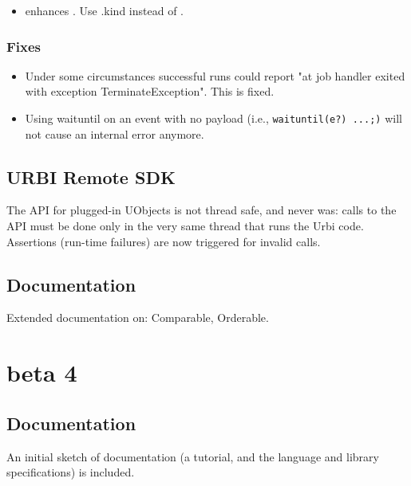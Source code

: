 \begin{itemize}
\item {} enhances .  Use
  .kind instead of .
\end{itemize}

\subsubsection{Fixes}
\begin{itemize}
\item Under some circumstances successful runs could report "at job
  handler exited with exception TerminateException".  This is fixed.

\item Using waituntil on an event with no payload (i.e.,
  \lstinline|waituntil(e?) ...;)| will not cause an internal error
  anymore.
\end{itemize}

\subsection{URBI Remote SDK}

The API for plugged-in UObjects is not thread safe, and never was:
calls to the API must be done only in the very same thread that runs
the Urbi code.  Assertions (run-time failures) are now triggered for
invalid calls.

\subsection{Documentation}

Extended documentation on: Comparable, Orderable.


\section{ beta 4}

\subsection{Documentation}

An initial sketch of documentation (a tutorial, and the language and
library specifications) is included.

\subsection{\us}
